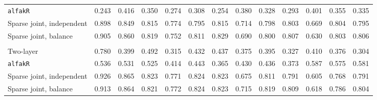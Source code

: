 \begin{center}
\begin{tabular}{l*{12}{r}}
\quad \texttt{alfakR} & 0.243 & 0.416 & 0.350 & 0.274 & 0.308 & 0.254 & 0.380 & 0.328 & 0.293 & 0.401 & 0.355 & 0.335 \\
\quad Sparse joint, independent & 0.898 & 0.849 & 0.815 & 0.774 & 0.795 & 0.815 & 0.714 & 0.798 & 0.803 & 0.669 & 0.804 & 0.795 \\
\quad Sparse joint, balance & 0.905 & 0.860 & 0.819 & 0.752 & 0.811 & 0.829 & 0.690 & 0.800 & 0.807 & 0.630 & 0.803 & 0.806 \\
\addlinespace[2pt]
\multicolumn{13}{l}{\textit{3000/100, 360 d}} \\
\quad Two-layer & 0.780 & 0.399 & 0.492 & 0.315 & 0.432 & 0.437 & 0.375 & 0.395 & 0.327 & 0.410 & 0.376 & 0.304 \\
\quad \texttt{alfakR} & 0.536 & 0.531 & 0.525 & 0.414 & 0.443 & 0.365 & 0.430 & 0.436 & 0.373 & 0.587 & 0.575 & 0.581 \\
\quad Sparse joint, independent & 0.926 & 0.865 & 0.823 & 0.771 & 0.824 & 0.823 & 0.675 & 0.811 & 0.791 & 0.605 & 0.768 & 0.791 \\
\quad Sparse joint, balance & 0.913 & 0.864 & 0.821 & 0.772 & 0.824 & 0.823 & 0.715 & 0.819 & 0.809 & 0.618 & 0.786 & 0.804 \\
\bottomrule
\end{tabular}
\end{center}

